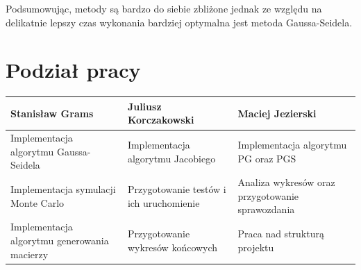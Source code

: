 \documentclass[10pt]{article}
\begin{document}
Podsumowując, metody są bardzo do siebie zbliżone jednak ze względu na delikatnie lepszy czas wykonania bardziej optymalna jest metoda Gaussa-Seidela.

\section{Podział pracy}
\centering
	\begin{tabular}{| p{5cm} | p{5cm} | p{5cm} |}
		\hline
		\textbf{Stanisław Grams} & \textbf{Juliusz Korczakowski} & \textbf{Maciej Jezierski} \\ \hline
		Implementacja algorytmu Gaussa-Seidela & Implementacja algorytmu Jacobiego & Implementacja algorytmu PG oraz PGS  \\ \hline
		 Implementacja symulacji Monte Carlo& Przygotowanie testów i ich uruchomienie &Analiza wykresów oraz przygotowanie sprawozdania \\ \hline
		Implementacja algorytmu generowania macierzy & Przygotowanie wykresów końcowych &Praca nad strukturą projektu\\ \hline
	\end{tabular}
\
\end{document}
